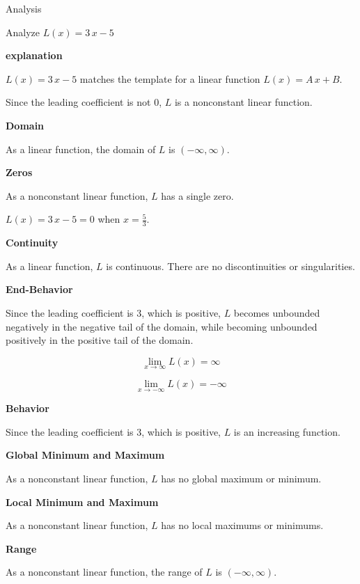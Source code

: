 \documentclass{ximera}
\begin{document}
\begin{example} Analysis

Analyze $L(x) = 3 \, x - 5$  



\textbf{\textcolor{red!75!green}{explanation}} 



$L(x) = 3 \, x - 5$ matches the template for a linear function $L(x) = A \, x + B$.

Since the leading coefficient is not $0$, $L$ is a nonconstant linear function.



\textbf{Domain} 

As a linear function, the domain of $L$ is $(-\infty, \infty)$.


\textbf{Zeros} 

As a nonconstant linear function, $L$ has a single zero.

$L(x) = 3 \, x - 5 = 0$ when $x = \frac{5}{3}$. 


\textbf{Continuity} 

As a linear function, $L$ is continuous.  There are no discontinuities or singularities. 



\textbf{End-Behavior} 

Since the leading coefficient is $3$, which is positive, $L$ becomes unbounded negatively in the negative tail of the domain, while becoming unbounded positively in the positive tail of the domain.


\[
\lim\limits_{x \to \infty} L(x) = \infty
\]

\[
\lim\limits_{x \to -\infty} L(x) = -\infty
\]


\textbf{Behavior} 

Since the leading coefficient is $3$, which is positive, $L$ is an increasing function. 



\textbf{Global Minimum and Maximum} 

As a nonconstant linear function, $L$ has no global maximum or minimum. 



\textbf{Local Minimum and Maximum} 

As a nonconstant linear function, $L$ has no local maximums or minimums. 



\textbf{Range} 

As a nonconstant linear function, the range of $L$ is $(-\infty, \infty)$. 



\end{example}
\end{document}
